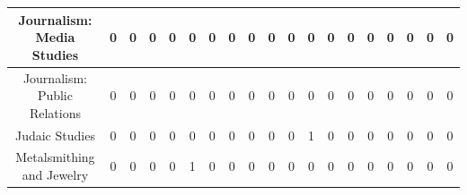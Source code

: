 \documentclass[10pt]{article}
\begin{document}
\begin{landscape}
\begin{longtable}[c]{|ccccccccccccccccccc|}
	\multicolumn{1}{|c|}{Journalism: Media Studies}                  & \multicolumn{1}{c|}{0}          & \multicolumn{1}{c|}{0}          & \multicolumn{1}{c|}{0}          & \multicolumn{1}{c|}{0}          & \multicolumn{1}{c|}{0}          & \multicolumn{1}{c|}{0}          & \multicolumn{1}{c|}{0}          & \multicolumn{1}{c|}{0}          & \multicolumn{1}{c|}{0}          & \multicolumn{1}{c|}{0}          & \multicolumn{1}{c|}{0}          & \multicolumn{1}{c|}{0}          & \multicolumn{1}{c|}{0}          & \multicolumn{1}{c|}{0}          & \multicolumn{1}{c|}{0}          & \multicolumn{1}{c|}{0}          & \multicolumn{1}{c|}{0}          & 0          \\ \hline
	\multicolumn{1}{|c|}{Journalism: Public Relations}               & \multicolumn{1}{c|}{0}          & \multicolumn{1}{c|}{0}          & \multicolumn{1}{c|}{0}          & \multicolumn{1}{c|}{0}          & \multicolumn{1}{c|}{0}          & \multicolumn{1}{c|}{0}          & \multicolumn{1}{c|}{0}          & \multicolumn{1}{c|}{0}          & \multicolumn{1}{c|}{0}          & \multicolumn{1}{c|}{0}          & \multicolumn{1}{c|}{0}          & \multicolumn{1}{c|}{0}          & \multicolumn{1}{c|}{0}          & \multicolumn{1}{c|}{0}          & \multicolumn{1}{c|}{0}          & \multicolumn{1}{c|}{0}          & \multicolumn{1}{c|}{0}          & 0          \\ \hline
	\multicolumn{1}{|c|}{Judaic Studies}                             & \multicolumn{1}{c|}{0}          & \multicolumn{1}{c|}{0}          & \multicolumn{1}{c|}{0}          & \multicolumn{1}{c|}{0}          & \multicolumn{1}{c|}{0}          & \multicolumn{1}{c|}{0}          & \multicolumn{1}{c|}{0}          & \multicolumn{1}{c|}{0}          & \multicolumn{1}{c|}{0}          & \multicolumn{1}{c|}{0}          & \multicolumn{1}{c|}{1}          & \multicolumn{1}{c|}{0}          & \multicolumn{1}{c|}{0}          & \multicolumn{1}{c|}{0}          & \multicolumn{1}{c|}{0}          & \multicolumn{1}{c|}{0}          & \multicolumn{1}{c|}{0}          & 0          \\ \hline
	\multicolumn{1}{|c|}{Metalsmithing and Jewelry}                  & \multicolumn{1}{c|}{0}          & \multicolumn{1}{c|}{0}          & \multicolumn{1}{c|}{0}          & \multicolumn{1}{c|}{0}          & \multicolumn{1}{c|}{1}          & \multicolumn{1}{c|}{0}          & \multicolumn{1}{c|}{0}          & \multicolumn{1}{c|}{0}          & \multicolumn{1}{c|}{0}          & \multicolumn{1}{c|}{0}          & \multicolumn{1}{c|}{0}          & \multicolumn{1}{c|}{0}          & \multicolumn{1}{c|}{0}          & \multicolumn{1}{c|}{0}          & \multicolumn{1}{c|}{0}          & \multicolumn{1}{c|}{0}          & \multicolumn{1}{c|}{0}          & 0          \\ \hline

\end{longtable}
\end{landscape}
\end{document}

